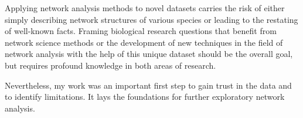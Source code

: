 Applying network analysis methods to novel datasets carries the risk of either simply describing network structures of various species or leading to the restating of well-known facts.
Framing biological research questions that benefit from network science methods or the development of new techniques in the field of network analysis with the help of this unique dataset should be the overall goal, but requires profound knowledge in both areas of research.

Nevertheless, my work was an important first step to gain trust in the data and to identify limitations. It lays the foundations for further exploratory network analysis.